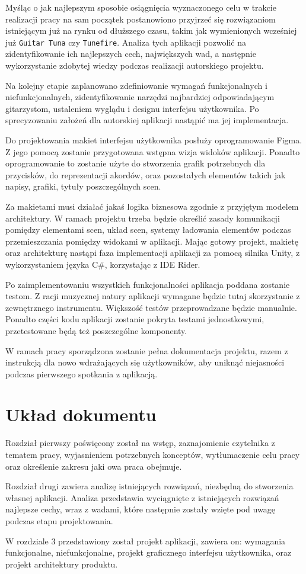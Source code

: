 Myśląc o jak najlepszym sposobie osiągnięcia wyznaczonego celu w trakcie realizacji pracy na sam początek postanowiono przyjrzeć się rozwiązaniom istniejącym już na rynku od dłuższego czasu, takim jak wymienionych wcześniej już \texttt{Guitar Tuna} czy \texttt{Tunefire}. %
Analiza tych aplikacji pozwolić na zidentyfikowanie ich najlepszych cech, największych wad, a następnie wykorzystanie zdobytej wiedzy podczas realizacji autorskiego projektu. 

Na kolejny etapie zaplanowano zdefiniowanie wymagań funkcjonalnych i niefunkcjonalnych, zidentyfikowanie narzędzi najbardziej odpowiadającym gitarzystom, ustaleniem wyglądu i designu interfejsu użytkownika. Po sprecyzowaniu założeń dla autorskiej aplikacji nastąpić ma jej implementacja. 

Do projektowania makiet interfejsu użytkownika posłuży oprogramowanie Figma. Z jego pomocą zostanie przygotowana wstępna wizja widoków aplikacji. Ponadto oprogramowanie to zostanie użyte do stworzenia grafik potrzebnych dla przycisków, do reprezentacji akordów, oraz pozostałych elementów takich jak napisy, grafiki, tytuły poszczególnych scen. 

Za makietami musi działać jakaś logika biznesowa zgodnie z przyjętym modelem architektury. W ramach projektu trzeba będzie określić zasady komunikacji pomiędzy elementami scen, układ scen, systemy ładowania elementów podczas przemieszczania pomiędzy widokami w aplikacji. Mając gotowy projekt, makietę oraz architekturę nastąpi faza implementacji aplikacji za pomocą silnika Unity, z wykorzystaniem języka C\#, korzystając z IDE Rider.

Po zaimplementowaniu wszystkich funkcjonalności aplikacja poddana zostanie testom. Z racji muzycznej natury aplikacji wymagane będzie tutaj skorzystanie z zewnętrznego instrumentu. Większość testów przeprowadzane będzie manualnie. Ponadto części kodu aplikacji zostanie pokryta testami jednostkowymi, przetestowane będą też poszczególne komponenty. 

W ramach pracy sporządzona zostanie pełna dokumentacja projektu, razem z instrukcją dla nowo wdrażających się użytkowników, aby uniknąć niejasności podczas pierwszego spotkania z aplikacją. 


\section{Układ dokumentu}
Rozdział pierwszy poświęcony został na wstęp, zaznajomienie czytelnika z tematem pracy, wyjasnieniem potrzebnych konceptów, wytłumaczenie celu pracy oraz określenie zakresu jaki owa praca obejmuje. 

Rozdział drugi zawiera analizę istniejących rozwiązań, niezbędną do stworzenia własnej aplikacji. Analiza przedstawia wyciągnięte z istniejących rozwiązań najlepsze cechy, wraz z wadami, które następnie zostały wzięte pod uwagę podczas etapu projektowania.

W rozdziale 3 przedstawiony został projekt aplikacji, zawiera on: wymagania funkcjonalne, niefunkcjonalne, projekt graficznego interfejsu użytkownika, oraz projekt architektury produktu.

